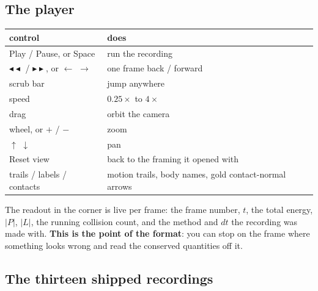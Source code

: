 \documentclass[11pt]{article}
\begin{document}
\subsection{The player}

\begin{center}
\begin{tabular}{ll}
\textbf{control} & \textbf{does}\\\hline
Play / Pause, or Space & run the recording\\
$\blacktriangleleft\blacktriangleleft$ / $\blacktriangleright\blacktriangleright$, or $\leftarrow$ $\rightarrow$ & one frame back / forward\\
scrub bar & jump anywhere\\
speed & $0.25\times$ to $4\times$\\
drag & orbit the camera\\
wheel, or $+$ / $-$ & zoom\\
$\uparrow$ $\downarrow$ & pan\\
Reset view & back to the framing it opened with\\
trails / labels / contacts & motion trails, body names, gold contact-normal arrows\\
\end{tabular}
\end{center}

The readout in the corner is live per frame: the frame number, $t$, the
total energy, $|P|$, $|L|$, the running collision count, and the method
and $dt$ the recording was made with. \textbf{This is the point of the
format}: you can stop on the frame where something looks wrong and read
the conserved quantities off it.

\subsection{The thirteen shipped recordings}
\end{document}

